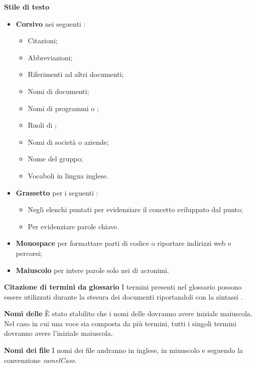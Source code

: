 \textbf{Stile di testo} 
\begin{itemize}
\item \textbf{Corsivo}  nei seguenti :
  \begin{itemize}
  \item Citazioni;
  \item Abbreviazioni;
  \item Riferimenti ad altri documenti;
  \item Nomi di documenti;
  \item Nomi di programmi o ;
  \item Ruoli di ;
  \item Nomi di societ\`a o aziende;
  \item Nome del gruppo;
  \item Vocaboli in lingua inglese.
  \end{itemize}
\item \textbf{Grassetto} per i seguenti :
  \begin{itemize}
  \item Negli elenchi puntati per evidenziare il concetto sviluppato dal punto;
  \item Per evidenziare parole chiave.
  \end{itemize}
\item \textbf{Monospace} per formattare parti di codice o riportare indirizzi web e percorsi;
\item \textbf{Maiuscolo} per intere parole solo nei  di acronimi.
\end{itemize}

\textbf{Citazione di termini da glossario}
I termini presenti nel glossario possono essere utilizzati durante la stesura dei documenti riportandoli con la sintassi .

\textbf{Nomi delle }
\`E stato stabilito che i nomi delle  dovranno avere iniziale maiuscola.		
Nel caso in cui una voce sia composta da pi\`u termini, tutti i singoli termini dovranno avere l'iniziale maiuscola.

\textbf{Nomi dei file}
I nomi dei file andranno in inglese, in minuscolo e seguendo la convenzione \textit{camelCase}.



